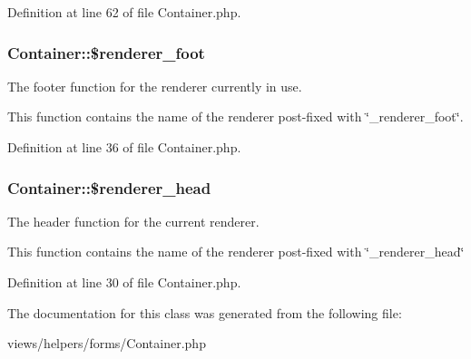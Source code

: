 Definition at line 62 of file Container.php.

\hypertarget{class_container_a44d1d90a83f29db520115fb9d99167e5}{
\subsubsection[{\$renderer\_\-foot}]{\setlength{\rightskip}{0pt plus 5cm}Container::\$renderer\_\-foot}}
\label{class_container_a44d1d90a83f29db520115fb9d99167e5}


The footer function for the renderer currently in use. 

This function contains the name of the renderer post-\/fixed with \char`\"{}\_\-renderer\_\-foot\char`\"{}. 

Definition at line 36 of file Container.php.

\hypertarget{class_container_a8d9081d6c3f2cfbadffda41b60647111}{
\subsubsection[{\$renderer\_\-head}]{\setlength{\rightskip}{0pt plus 5cm}Container::\$renderer\_\-head}}
\label{class_container_a8d9081d6c3f2cfbadffda41b60647111}


The header function for the current renderer. 

This function contains the name of the renderer post-\/fixed with \char`\"{}\_\-renderer\_\-head\char`\"{} 

Definition at line 30 of file Container.php.



The documentation for this class was generated from the following file:\begin{DoxyCompactItemize}
\item 
views/helpers/forms/Container.php\end{DoxyCompactItemize}
